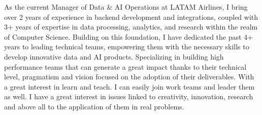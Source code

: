 

\begin{cvparagraph}

As the current Manager of Data \& AI Operations at LATAM Airlines, I bring over 2 years of experience in backend development and integrations, coupled with 3+ years of expertise in data processing, analytics, and research within the realm of Computer Science. Building on this foundation, I have dedicated the past 4+ years to leading technical teams, empowering them with the necessary skills to develop innovative data and AI products. Specializing in building high performance teams that can generate a great impact thanks to their technical level, pragmatism and vision focused on the adoption of their deliverables. With a great interest in learn and teach. I can easily join work teams and leader them as well. I have a great interest in issues linked to creativity, innovation, research and above all to the application of them in real problems.
\end{cvparagraph}
